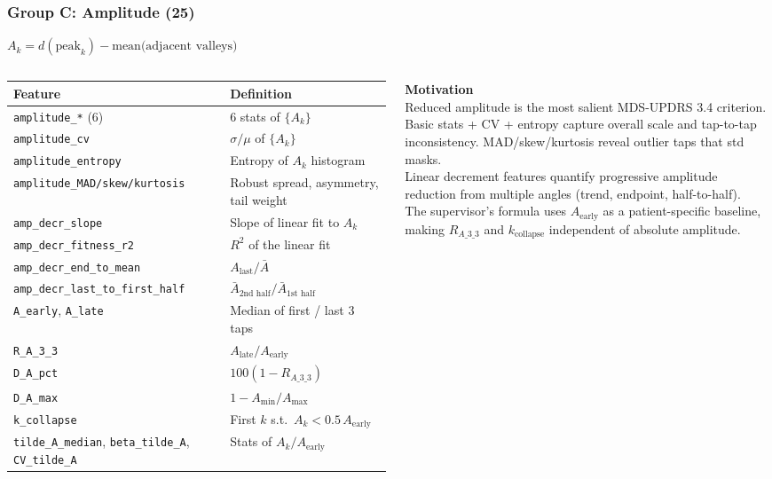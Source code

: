 \documentclass[aspectratio=169]{beamer}
\begin{document}
\begin{frame}
    \frametitle{Group C: Amplitude (25)}
    \scriptsize
    $A_k = d(\text{peak}_k) - \text{mean(adjacent valleys)}$\\[0.3em]
    \begin{columns}[T]
        \renewcommand{\arraystretch}{1.15}
        \begin{tabular}{p{4.2cm}p{2.8cm}}
            \toprule
            \textbf{Feature} & \textbf{Definition} \\
            \midrule
            \texttt{amplitude\_*} (6) & 6 stats of $\{A_k\}$ \\
            \texttt{amplitude\_cv} & $\sigma/\mu$ of $\{A_k\}$ \\
            \texttt{amplitude\_entropy} & Entropy of $A_k$ histogram \\
            \texttt{amplitude\_MAD/skew/kurtosis} & Robust spread, asymmetry, tail weight \\
            \midrule
            \texttt{amp\_decr\_slope} & Slope of linear fit to $A_k$ \\
            \texttt{amp\_decr\_fitness\_r2} & $R^2$ of the linear fit \\
            \texttt{amp\_decr\_end\_to\_mean} & $A_\text{last}/\bar{A}$ \\
            \texttt{amp\_decr\_last\_to\_first\_half} & $\bar{A}_\text{2nd half}/\bar{A}_\text{1st half}$ \\
            \midrule
            \texttt{A\_early}, \texttt{A\_late} & Median of first / last 3 taps \\
            \texttt{R\_A\_3\_3} & $A_\text{late}/A_\text{early}$ \\
            \texttt{D\_A\_pct} & $100(1-R_{A\_3\_3})$ \\
            \texttt{D\_A\_max} & $1 - A_\text{min}/A_\text{max}$ \\
            \texttt{k\_collapse} & First $k$ s.t.\ $A_k < 0.5\,A_\text{early}$ \\
            \texttt{tilde\_A\_median}, \texttt{beta\_tilde\_A}, \texttt{CV\_tilde\_A} & Stats of $A_k/A_\text{early}$ \\
            \bottomrule
        \end{tabular}

        \textbf{Motivation}\\[0.3em]
        Reduced amplitude is the most salient MDS-UPDRS 3.4 criterion.\\[0.4em]
        Basic stats + CV + entropy capture overall scale and tap-to-tap inconsistency. MAD/skew/kurtosis reveal outlier taps that std masks.\\[0.4em]
        Linear decrement features quantify progressive amplitude reduction from multiple angles (trend, endpoint, half-to-half).\\[0.4em]
        The supervisor's formula uses $A_\text{early}$ as a patient-specific baseline, making $R_{A\_3\_3}$ and $k_\text{collapse}$ independent of absolute amplitude.
    \end{columns}
\end{frame}
\end{document}
